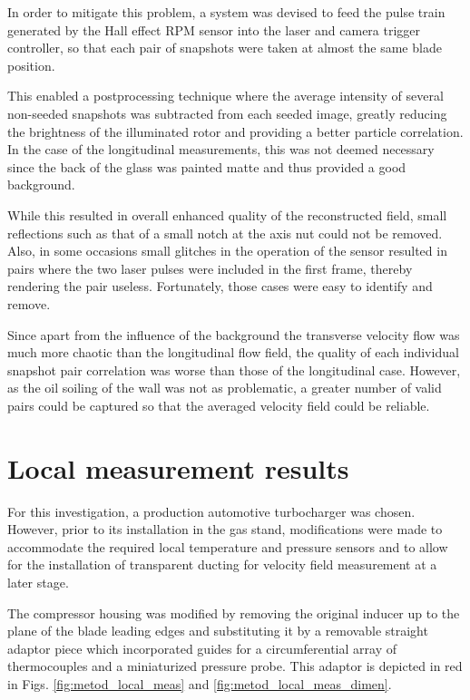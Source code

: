 In order to mitigate this problem, a system was devised to feed the pulse train generated by the Hall effect RPM sensor into the laser and camera trigger controller, so that each pair of snapshots were taken at almost the same blade position.

This enabled a postprocessing technique where the average intensity of several non-seeded snapshots was subtracted from each seeded image, greatly reducing the brightness of the illuminated rotor and providing a better particle correlation. In the case of the longitudinal measurements, this was not deemed necessary since the back of the glass was painted matte and thus provided a good background.

While this resulted in overall enhanced quality of the reconstructed field, small reflections such as that of a small notch at the axis nut could not be removed. Also, in some occasions small glitches in the operation of the sensor resulted in pairs where the two laser pulses were included in the first frame, thereby rendering the pair useless. Fortunately, those cases were easy to identify and remove.

Since apart from the influence of the background the transverse velocity flow was much more chaotic than the longitudinal flow field, the quality of each individual snapshot pair correlation was worse than those of the longitudinal case. However, as the oil soiling of the wall was not as problematic, a greater number of valid pairs could be captured so that the averaged velocity field could be reliable.

\section{Local measurement results}

For this investigation, a production automotive turbocharger was chosen. However, prior to its installation in the gas stand, modifications were made to accommodate the required local temperature and pressure sensors and to allow for the installation of transparent ducting for velocity field measurement at a later stage.

The compressor housing was modified by removing the original inducer up to the plane of the blade leading edges and substituting it by a removable straight adaptor piece which incorporated guides for a circumferential array of thermocouples and a miniaturized pressure probe. This adaptor is depicted in red in Figs. \ref{fig:metod_local_meas} and \ref{fig:metod_local_meas_dimen}.

